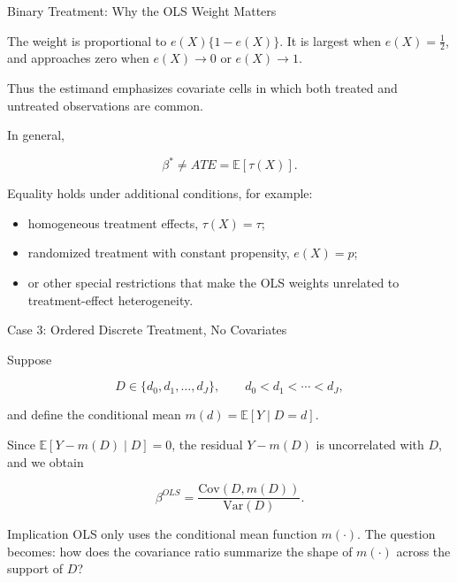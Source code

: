\documentclass[aspectratio=169,11pt]{beamer}
\begin{document}
\begin{frame}{Binary Treatment: Why the OLS Weight Matters}
\small

The weight is proportional to \(e(X)\{1-e(X)\}\).
It is largest when \(e(X)=\tfrac{1}{2}\), and approaches zero when
\(e(X)\rightarrow 0\) or \(e(X)\rightarrow 1\).

\medskip

Thus the estimand emphasizes covariate cells in which both treated
and untreated observations are common.

\medskip

In general,

\[
\boxed{
\beta^*
\neq
ATE
=
\mathbb{E}[\tau(X)].
}
\]

Equality holds under additional conditions, for example:

\begin{itemize}
    \item homogeneous treatment effects, \(\tau(X)=\tau\);
    \item randomized treatment with constant propensity, \(e(X)=p\);
    \item or other special restrictions that make the OLS weights
    unrelated to treatment-effect heterogeneity.
\end{itemize}

\end{frame}



\begin{frame}{Case 3: Ordered Discrete Treatment, No Covariates}
\small

Suppose

\[
D\in\{d_0,d_1,\ldots,d_J\},
\qquad
d_0<d_1<\cdots<d_J,
\]

and define the conditional mean
\(m(d)=\mathbb{E}[Y\mid D=d]\).

\medskip

Since \(\mathbb{E}[Y-m(D)\mid D]=0\), the residual \(Y-m(D)\) is
uncorrelated with \(D\), and we obtain

\[
\boxed{
\beta^{OLS}
=
\frac{
\mathrm{Cov}(D,m(D))
}{
\mathrm{Var}(D)
}.
}
\]

\begin{block}{Implication}
OLS only uses the conditional mean function \(m(\cdot)\).
The question becomes: how does the covariance ratio summarize the
shape of \(m(\cdot)\) across the support of \(D\)?
\end{block}

\end{frame}
\end{document}

